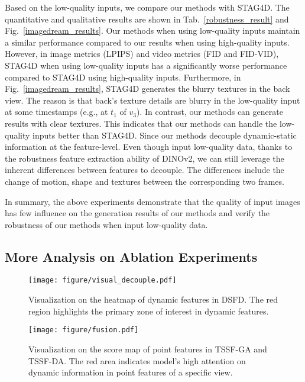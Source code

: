 Based on the low-quality inputs, we compare our methods with STAG4D. The quantitative and qualitative results are shown in Tab.~\ref{robustness_result} and Fig.~\ref{imagedream_results}. Our methods when using low-quality inputs maintain a similar performance compared to our results when using high-quality inputs. However, in image metrics (LPIPS) and video metrics (FID and FID-VID), STAG4D when using low-quality inputs has a significantly worse performance compared to STAG4D using high-quality inputs. Furthermore, in Fig.~\ref{imagedream_results}, STAG4D generates the blurry textures in the back view. The reason is that back's texture details are blurry in the low-quality input at some timestamps (e.g., at $t_1$ of $v_3$). In contrast, our methods can generate results with clear textures. This indicates that our methods can handle the low-quality inputs better than STAG4D. Since our methods decouple dynamic-static information at the feature-level. Even though input low-quality data, thanks to the robustness feature extraction ability of DINOv2, we can still leverage the inherent differences between features to decouple. The differences include the change of motion, shape and textures between the corresponding two frames.

In summary, the above experiments demonstrate that the quality of input images has few influence on the generation results of our methods and verify the robustness of our methods when input low-quality data.



\subsection{More Analysis on Ablation Experiments}
\begin{figure}[t]%
\centering
\texttt{[image: figure/visual\_decouple.pdf]}
\caption{Visualization on the heatmap of dynamic features in DSFD. The red region highlights the primary zone of interest in dynamic features.}\label{decouple}
\end{figure}

\begin{figure}[t]%
\centering
\texttt{[image: figure/fusion.pdf]}
\caption{Visualization on the score map of point features in TSSF-GA and TSSF-DA. The red area indicates model's high attention on dynamic information in point features of a specific view.}\label{fusion}
\end{figure}

